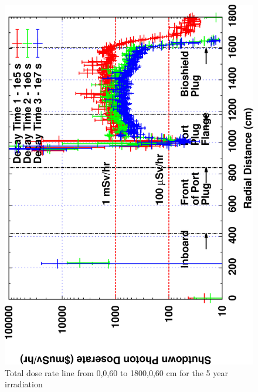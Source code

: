 \documentclass[12pt]{article}
\begin{document}
\begin{figure}[ht!]
\centering
\includegraphics[clip,scale=0.12,angle=-90]{../plots/photon_lineout/5yr/no-b4c_5yr.png}
\caption{Total dose rate line from 0,0,60 to 1800,0,60 cm for the 5 year irradiation}
\label{fig:photons_5y_nob4c_dose}
\end{figure}
\end{document}
